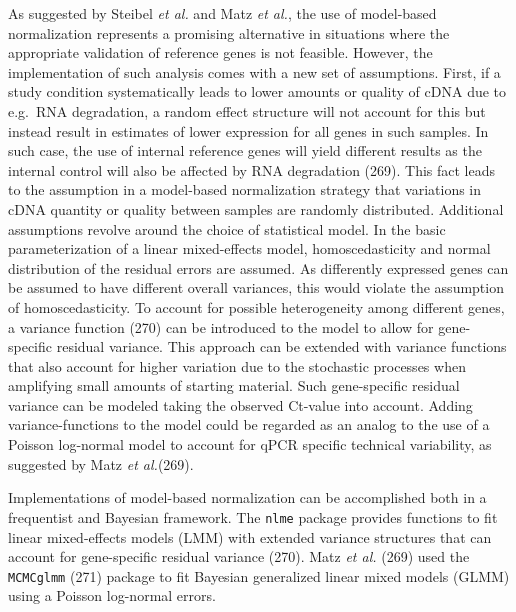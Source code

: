 \documentclass[twoside,10pt]{gihclass} %
\begin{document}
As suggested by Steibel \emph{et al.} and Matz \emph{et al.}, the use of model-based normalization represents a promising alternative in situations where the appropriate validation of reference genes is not feasible.
However, the implementation of such analysis comes with a new set of assumptions.
First, if a study condition systematically leads to lower amounts or quality of cDNA due to e.g.~RNA degradation, a random effect structure will not account for this but instead result in estimates of lower expression for all genes in such samples. In such case, the use of internal reference genes will yield different results as the internal control will also be affected by RNA degradation
(269).
This fact leads to the assumption in a model-based normalization strategy that variations in cDNA quantity or quality between samples are randomly distributed.
Additional assumptions revolve around the choice of statistical model.
In the basic parameterization of a linear mixed-effects model, homoscedasticity and normal distribution of the residual errors are assumed.
As differently expressed genes can be assumed to have different overall variances, this would violate the assumption of homoscedasticity. To account for possible heterogeneity among different genes, a variance function
(270)
can be introduced to the model to allow for gene-specific residual variance. This approach can be extended with variance functions that also account for higher variation due to the stochastic processes when amplifying small amounts of starting material.
Such gene-specific residual variance can be modeled taking the observed Ct-value into account.
Adding variance-functions to the model could be regarded as an analog to the use of a Poisson log-normal model to account for qPCR specific technical variability, as suggested by Matz \emph{et al.}(269).

Implementations of model-based normalization can be accomplished both in a frequentist and Bayesian framework.
The \texttt{nlme} package provides functions to fit linear mixed-effects models (LMM) with extended variance structures that can account for gene-specific residual variance (270).
Matz \emph{et al.} (269) used the \texttt{MCMCglmm} (271) package to fit Bayesian generalized linear mixed models (GLMM) using a Poisson log-normal errors.
\end{document}
